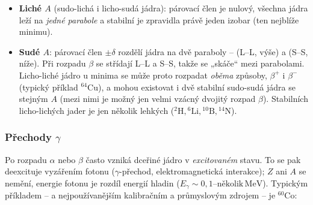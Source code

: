 \begin{itemize}
  \item \textbf{Liché \(A\)} (sudo-lichá i licho-sudá jádra): párovací člen je nulový, všechna jádra leží na \emph{jedné parabole}
  a stabilní je zpravidla právě jeden izobar (ten nejblíže minimu).
  \item \textbf{Sudé \(A\)}: párovací člen \(\pm\delta\) rozdělí jádra na dvě paraboly --  (L--L, výše) a 
  (S--S, níže). Při rozpadu \(\beta\) se střídají L--L a S--S, takže se „skáče“ mezi parabolami. Licho-liché jádro u minima se může
  proto rozpadat \emph{oběma} způsoby, \(\beta^+\) i \(\beta^-\) (typický příklad \({}^{64}\mathrm{Cu}\)), a mohou existovat i dvě stabilní
  sudo-sudá jádra se stejným \(A\) (mezi nimi je možný jen velmi vzácný dvojitý rozpad \(\beta\)). Stabilních licho-lichých jader je
  jen několik lehkých (\({}^2\mathrm{H}, {}^6\mathrm{Li}, {}^{10}\mathrm{B}, {}^{14}\mathrm{N}\)).
\end{itemize}

\subsubsection{Přechody \texorpdfstring{\(\gamma\)}{gama}}

Po rozpadu \(\alpha\) nebo \(\beta\) často vzniká dceřiné jádro v \emph{excitovaném} stavu. To se pak deexcituje vyzářením fotonu
(\(\gamma\)-přechod, elektromagnetická interakce); \(Z\) ani \(A\) se nemění, energie fotonu je rozdíl energií hladin
(\(E_\gamma\sim 0{,}1\)--\(\text{několik}\,\mathrm{MeV}\)). Typickým příkladem -- a nejpoužívanějším kalibračním a průmyslovým zdrojem -- je
\({}^{60}\mathrm{Co}\):

\begin{center}
\end{center}

